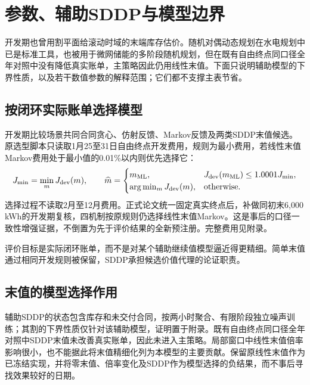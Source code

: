 \documentclass[UTF8,a4paper,zihao=-4,fontset=mac]{ctexart}
\begin{document}
\section{参数、辅助SDDP与模型边界}
开发期也曾用割平面给滚动时域的末端库存估价。随机对偶动态规划在水电规划中已是标准工具\cite{pereira}，也被用于微网储能的多阶段随机规划\cite{bhattacharya2018}，但在既有自由终点同口径全年对照中没有降低真实账单，主策略因此仍用线性末值。下面只说明辅助模型的下界性质，以及若干数值参数的解释范围；它们都不支撑主表节省。

\subsection{按闭环实际账单选择模型}
开发期比较场景共同合同贪心、仿射反馈、Markov反馈及两类SDDP末值候选。原选型脚本只读取1月25至31日自由终点开发费用，规则为最小费用，若线性末值Markov费用处于最小值的0.01\%以内则优先选择它：
\begin{equation}\label{eq:selection}
 J_{\min}=\min_mJ_{\rm dev}(m),\qquad
 \widehat m=\begin{cases}m_{\rm ML},&J_{\rm dev}(m_{\rm ML})\le1.0001J_{\min},\\
 \arg\min_mJ_{\rm dev}(m),&\text{otherwise}.
 \end{cases}
\end{equation}
选择过程不读取2月至12月费用。正式论文统一固定真实终点后，补做同初末6,000 kWh的开发期复核，四机制按原规则仍选择线性末值Markov。这是事后的口径一致性增强证据，不倒置为先于评价结果的全新预注册。完整费用见附录。

评价目标是实际闭环账单，而不是对某个辅助继续值模型逼近得更精细。简单末值通过相同开发规则被保留，SDDP承担候选价值代理的论证职责。

\subsection{末值的模型选择作用}
辅助SDDP的状态包含库存和未交付合同，按两小时聚合、有限阶段独立噪声训练；其割的下界性质仅针对该辅助模型，证明置于附录。既有自由终点同口径全年对照中SDDP末值未改善真实账单，因此未进入主策略。局部窗口中线性末值倍率影响很小，也不能据此将末值精细化列为本模型的主要贡献。保留原线性末值作为已冻结实现，并将零末值、倍率变化及SDDP作为模型选择的负结果，而不事后寻找效果较好的日期。 
\end{document}
